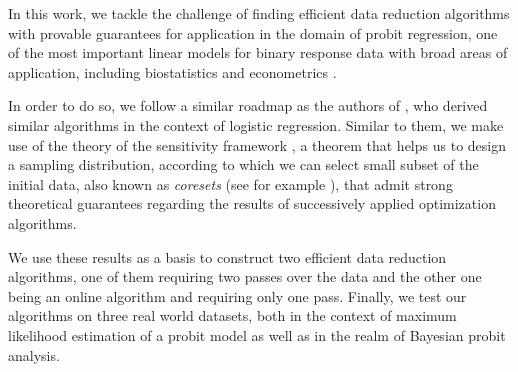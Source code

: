 In this work, we tackle the challenge of finding efficient
data reduction algorithms with provable guarantees for application
in the domain of probit regression, one of the most important
linear models for binary response data with broad areas of
application, including biostatistics \cite{probit-biostatistics}
and econometrics \cite{probit-econometrics}.

In order to do so, we follow a similar roadmap as the authors
of \cite{on-coresets}, who derived similar algorithms in the
context of logistic regression.
Similar to them, we make use of the theory of the
sensitivity framework \cite{big-data-tiny-data}, a theorem
that helps us to design a sampling distribution, according
to which we can select small subset of the initial data,
also known as \textit{coresets}
(see for example \cite{munteanu-coresets-introduction}),
that admit strong theoretical
guarantees regarding the results of successively applied
optimization algorithms.

We use these results as a basis to construct two efficient
data reduction algorithms, one of them requiring two passes
over the data and the other one being an online
algorithm and requiring only one pass.
Finally, we test our algorithms on three real world datasets,
both in the context of maximum likelihood estimation of a probit model
as well as in the realm of Bayesian probit analysis.
